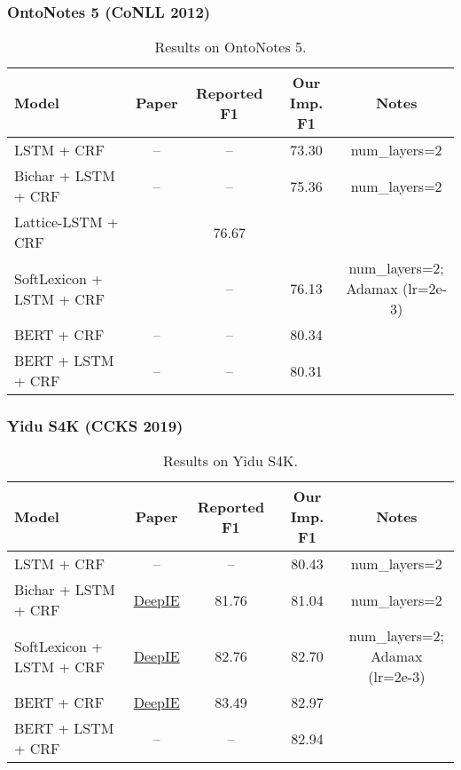 \documentclass{article}
\begin{document}
\subsubsection{OntoNotes 5 (CoNLL 2012)}
\begin{table}[H]
    \centering
    \begin{tabular}{lcccc}
    \toprule
    Model & Paper & Reported F1 & Our Imp. F1 & Notes \\
    \midrule
    LSTM + CRF                  & --                & --    & 73.30 & num\_layers=2 \\
    Bichar + LSTM + CRF         & --                & --    & 75.36 & num\_layers=2 \\
    Lattice-LSTM + CRF          & \citet{jie2019dependency} & 76.67 \\
    SoftLexicon + LSTM + CRF    & \citet{ma2020simplify}    & --    & 76.13 & \makecell{num\_layers=2; \\Adamax (lr=2e-3)} \\
    \midrule
    BERT + CRF                  & --                & --    & 80.34 \\
    BERT + LSTM + CRF           & --                & --    & 80.31 \\
    \bottomrule
    \end{tabular}
    \caption{Results on OntoNotes 5.} 
\end{table}


\subsubsection{Yidu S4K (CCKS 2019)}
\begin{table}[H]
    \centering
    \begin{tabular}{lcccc}
    \toprule
    Model & Paper & Reported F1 & Our Imp. F1 & Notes \\
    \midrule
    LSTM + CRF                  & --                                                  & --    & 80.43 & num\_layers=2 \\
    Bichar + LSTM + CRF         & \href{https://github.com/loujie0822/DeepIE}{DeepIE} & 81.76 & 81.04 & num\_layers=2 \\
    SoftLexicon + LSTM + CRF    & \href{https://github.com/loujie0822/DeepIE}{DeepIE} & 82.76 & 82.70 & \makecell{num\_layers=2; \\Adamax (lr=2e-3)} \\
    \midrule
    BERT + CRF                  & \href{https://github.com/loujie0822/DeepIE}{DeepIE} & 83.49 & 82.97 \\
    BERT + LSTM + CRF           & --                                                  & --    & 82.94 \\
    \bottomrule
    \end{tabular}
    \caption{Results on Yidu S4K.} 
\end{table}


\newpage

 
\end{document}
